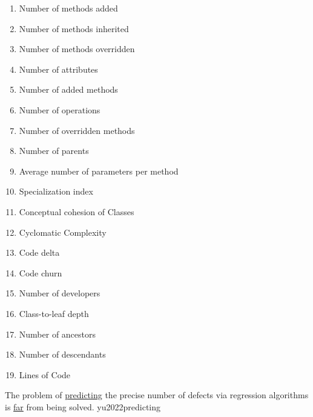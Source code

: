 \documentclass{article}
\begin{document}
{\begin{pptWide}{5}
\begin{enumerate}
  \item \textbf{} Number of methods added
  \item \textbf{} Number of methods inherited
  \item \textbf{} Number of methods overridden
  \item \textbf{} Number of attributes
  \item \textbf{} Number of added methods
  \item \textbf{} Number of operations
  \item \textbf{} Number of overridden methods
  \item \textbf{} Number of parents
  \item \textbf{} Average number of parameters per method
  \item \textbf{} Specialization index
  \item \textbf{} Conceptual cohesion of Classes
  \item \textbf{} Cyclomatic Complexity
  \item \textbf{} Code delta
  \item \textbf{} Code churn
  \item \textbf{} Number of developers
  \item \textbf{} Class-to-leaf depth
  \item \textbf{} Number of ancestors
  \item \textbf{} Number of descendants
  \item \textbf{} Lines of Code
  \end{enumerate}
  \end{pptWide}
  \par
  }

  {The problem of \ul{predicting} the precise number of defects via regression algorithms is \ul{far} from being solved.}
  {yu2022predicting}
\end{document}
